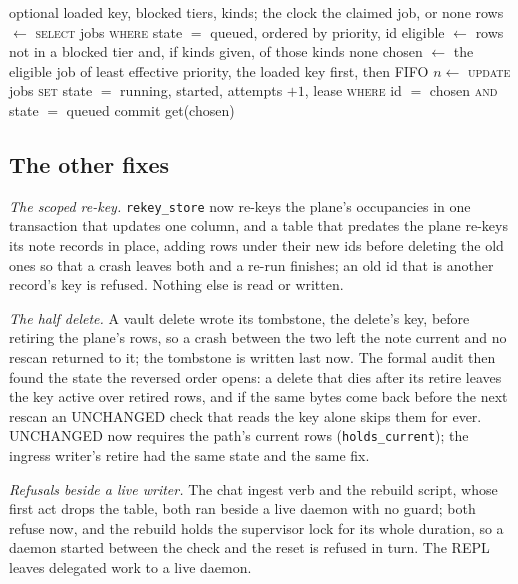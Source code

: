 \documentclass[11pt]{article}
\theoremstyle{plain}
\theoremstyle{definition}
\theoremstyle{remark}
\begin{document}
\begin{algorithm}[htbp]
\caption{\texttt{JobQueue.claim} as a compare-and-set (\texttt{scheduler/queue.py}).}\label{alg:claim}
\begin{algorithmic}[1]
\Require optional loaded key, blocked tiers, kinds; the clock
\Ensure the claimed job, or none
\Loop
  \State rows $\gets$ \textsc{select} jobs \textsc{where} state $=$ queued, ordered by priority, id
  \State eligible $\gets$ rows not in a blocked tier and, if kinds given, of those kinds
   \Return none \EndIf
  \State chosen $\gets$ the eligible job of least effective priority, the loaded key first, then FIFO
  \State $n \gets$ \textsc{update} jobs \textsc{set} state $=$ running, started, attempts $+ 1$, lease
  \Statex \hspace{\algorithmicindent}\hspace{\algorithmicindent} \textsc{where} id $=$ chosen \textsc{and} state $=$ queued
  \State commit
   \Return get(chosen) \EndIf {}
\EndLoop
\end{algorithmic}
\end{algorithm}

\subsection{The other fixes}

\emph{The scoped re-key.} \texttt{rekey\_store} now re-keys the plane's occupancies in one
transaction that updates one column, and a table that predates the plane re-keys its note records
in place, adding rows under their new ids before deleting the old ones so that a crash leaves both
and a re-run finishes; an old id that is another record's key is refused. Nothing else is read or
written.

\emph{The half delete.} A vault delete wrote its tombstone, the delete's key, before retiring the
plane's rows, so a crash between the two left the note current and no rescan returned to it; the
tombstone is written last now. The formal audit then found the state the reversed order opens: a
delete that dies after its retire leaves the key active over retired rows, and if the same bytes
come back before the next rescan an UNCHANGED check that reads the key alone skips them for ever.
UNCHANGED now requires the path's current rows (\texttt{holds\_current}); the ingress writer's
retire had the same state and the same fix.

\emph{Refusals beside a live writer.} The chat ingest verb and the rebuild script, whose first act
drops the table, both ran beside a live daemon with no guard; both refuse now, and the rebuild
holds the supervisor lock for its whole duration, so a daemon started between the check and the
reset is refused in turn. The REPL leaves delegated work to a live daemon.
\end{document}
